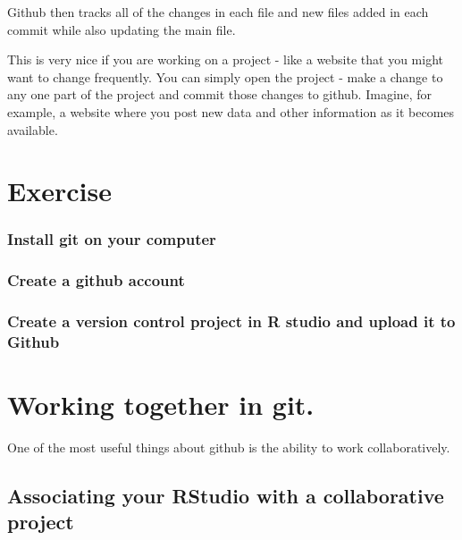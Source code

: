 \documentclass[
  letterpaper,
  DIV=11,
  numbers=noendperiod]{scrartcl}
\begin{document}
Github then tracks all of the changes in each file and new files added
in each commit while also updating the main file.

This is very nice if you are working on a project - like a website that
you might want to change frequently. You can simply open the project -
make a change to any one part of the project and commit those changes to
github. Imagine, for example, a website where you post new data and
other information as it becomes available.

\hypertarget{exercise}{%
\section{Exercise}\label{exercise}}

\hypertarget{install-git-on-your-computer}{%
\subsubsection{Install git on your
computer}\label{install-git-on-your-computer}}

\hypertarget{create-a-github-account}{%
\subsubsection{Create a github account}\label{create-a-github-account}}

\hypertarget{create-a-version-control-project-in-r-studio-and-upload-it-to-github}{%
\subsubsection{Create a version control project in R studio and upload
it to
Github}\label{create-a-version-control-project-in-r-studio-and-upload-it-to-github}}

\hypertarget{working-together-in-git.}{%
\section{Working together in git.}\label{working-together-in-git.}}

One of the most useful things about github is the ability to work
collaboratively.

\hypertarget{associating-your-rstudio-with-a-collaborative-project}{%
\subsection{Associating your RStudio with a collaborative
project}\label{associating-your-rstudio-with-a-collaborative-project}}
\end{document}
